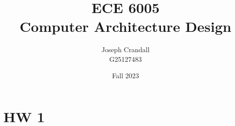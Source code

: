 
\usepackage{algorithm, algpseudocode, bm, color, gensymb, listings, siunitx, soul, subfiles, verbatim}
\usepackage[a4paper, total={7.5in, 10in}]{geometry}

\title{ECE 6005 \\ Computer Architecture Design}
\author{Joseph Crandall \\ G25127483}
\date{Fall 2023}


\maketitle

\section{HW 1}


\begin{comment}

\section{HW 2}


\section{Hw 3}




\end{comment}



